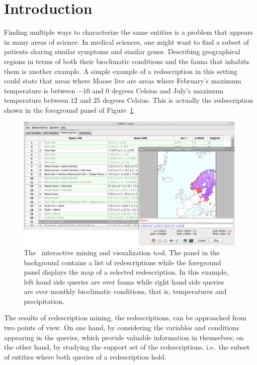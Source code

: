 \section{Introduction}

Finding multiple ways to characterize the same entities is a problem
that appears in many areas of science.  In medical sciences, one might
want to find a subset of patients sharing similar symptoms and similar
genes. Describing geographical regions in terms of both their
bioclimatic conditions and the fauna that inhabits them is another
example.  A simple example of a redescription in this setting could
state that areas where Moose live are areas where February's maximum
temperature is between $-10$ and $0$ degrees Celsius and July's
maximum temperature between $12$ and $25$ degrees Celsius.
This is actually the redescription shown in the foreground panel of
Figure~\ref{fig:both_panels}.

\begin{figure}[t]
  \centering
\includegraphics[width=\textwidth]{screenshots/both_panels_02}
  \caption{The \Siren\ interactive mining and visualization tool. The panel in the background contains a list of redescriptions while the foreground panel displays the map of a selected redescription.  In this example, left hand side queries are over fauna while right hand side queries are over monthly bioclimatic conditions, that is, temperatures and precipitation.}
  \label{fig:both_panels}
\end{figure}

The results of redescription mining, the redescriptions, can be
approached from two points of view. On one hand, by considering the
variables and conditions appearing in the queries, which provide
valuable information in themselves; on the other hand, by studying the
support set of the redescriptions, i.e.\ the subset of entities where
both queries of a redescription hold. 
 
